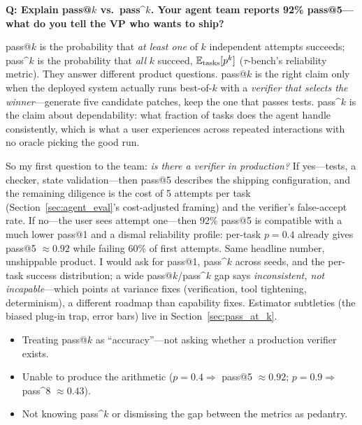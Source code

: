 
\begin{interviewq}
\textbf{Q: Explain pass@$k$ vs.\ pass\textasciicircum{}$k$. Your agent team reports 92\% pass@5---what do you tell the VP who wants to ship?}

 \quad {} \quad \badgefreq{\freqmed}

\stronganswer

pass@$k$ is the probability that \textit{at least one} of $k$ independent attempts succeeds; pass\textasciicircum{}$k$ is the probability that \textit{all} $k$ succeed, $\operatorname{\mathbb{E}}_{\text{tasks}}[p^k]$ ($\tau$-bench's reliability metric). They answer different product questions. pass@$k$ is the right claim only when the deployed system actually runs best-of-$k$ with a \textit{verifier that selects the winner}---generate five candidate patches, keep the one that passes tests. pass\textasciicircum{}$k$ is the claim about dependability: what fraction of tasks does the agent handle consistently, which is what a user experiences across repeated interactions with no oracle picking the good run.

So my first question to the team: \textit{is there a verifier in production?} If yes---tests, a checker, state validation---then pass@5 describes the shipping configuration, and the remaining diligence is the cost of 5 attempts per task (Section~\ref{sec:agent_eval}'s cost-adjusted framing) and the verifier's false-accept rate. If no---the user sees attempt one---then 92\% pass@5 is compatible with a much lower pass@1 and a dismal reliability profile: per-task $p = 0.4$ already gives pass@5 $\approx 0.92$ while failing 60\% of first attempts. Same headline number, unshippable product. I would ask for pass@1, pass\textasciicircum{}$k$ across seeds, and the per-task success distribution; a wide pass@$k$/pass\textasciicircum{}$k$ gap says \textit{inconsistent, not incapable}---which points at variance fixes (verification, tool tightening, determinism), a different roadmap than capability fixes. Estimator subtleties (the biased plug-in trap, error bars) live in Section~\ref{sec:pass_at_k}.

\redflags
\begin{itemize}
    \item Treating pass@$k$ as ``accuracy''---not asking whether a production verifier exists.
    \item Unable to produce the arithmetic ($p=0.4 \Rightarrow$ pass@5 $\approx 0.92$; $p=0.9 \Rightarrow$ pass\textasciicircum{}8 $\approx 0.43$).
    \item Not knowing pass\textasciicircum{}$k$ or dismissing the gap between the metrics as pedantry.
\end{itemize}


\end{interviewq}
